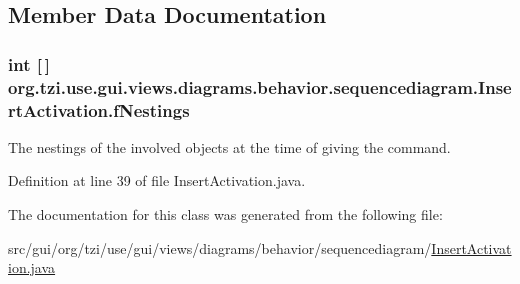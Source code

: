 \subsection{Member Data Documentation}
\hypertarget{classorg_1_1tzi_1_1use_1_1gui_1_1views_1_1diagrams_1_1behavior_1_1sequencediagram_1_1_insert_activation_a219cbc636d48306819eed8f615eead5c}{
\subsubsection[{f\-Nestings}]{\setlength{\rightskip}{0pt plus 5cm}int \mbox{[}$\,$\mbox{]} org.\-tzi.\-use.\-gui.\-views.\-diagrams.\-behavior.\-sequencediagram.\-Insert\-Activation.\-f\-Nestings\hspace{0.3cm}{\ttfamily [protected]}}}\label{classorg_1_1tzi_1_1use_1_1gui_1_1views_1_1diagrams_1_1behavior_1_1sequencediagram_1_1_insert_activation_a219cbc636d48306819eed8f615eead5c}
The nestings of the involved objects at the time of giving the command. 

Definition at line 39 of file Insert\-Activation.\-java.



The documentation for this class was generated from the following file\-:\begin{DoxyCompactItemize}
\item 
src/gui/org/tzi/use/gui/views/diagrams/behavior/sequencediagram/\hyperlink{_insert_activation_8java}{Insert\-Activation.\-java}\end{DoxyCompactItemize}
